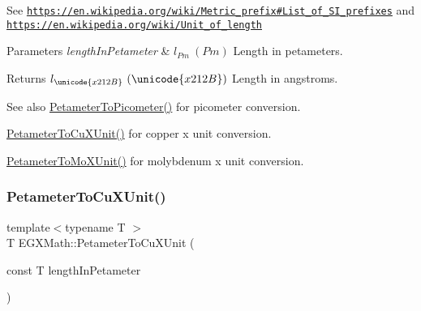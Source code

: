 See \href{https://en.wikipedia.org/wiki/Metric_prefix#List_of_SI_prefixes}{\tt https\+://en.\+wikipedia.\+org/wiki/\+Metric\+\_\+prefix\#\+List\+\_\+of\+\_\+\+S\+I\+\_\+prefixes} and \href{https://en.wikipedia.org/wiki/Unit_of_length}{\tt https\+://en.\+wikipedia.\+org/wiki/\+Unit\+\_\+of\+\_\+length} 
\begin{DoxyParams}{Parameters}
{\em length\+In\+Petameter} & $ l_{Pm}\ (Pm)$ Length in petameters. \\
\hline
\end{DoxyParams}
\begin{DoxyReturn}{Returns}
$ l_{\unicode{x212B}}\ (\unicode{x212B})$ Length in angstroms. 
\end{DoxyReturn}
\begin{DoxySeeAlso}{See also}
\mbox{\hyperlink{group___e_g_x_math-_conversions-_length_conversions-_s_i-_petameter-_s_i_ga092df775702bdd1b027e20a243d0aa75}{Petameter\+To\+Picometer()}} for picometer conversion. 

\mbox{\hyperlink{group___e_g_x_math-_conversions-_length_conversions-_s_i-_petameter-_non-_s_i_gad9b37964189c5963e4c634122fd763fe}{Petameter\+To\+Cu\+X\+Unit()}} for copper x unit conversion. 

\mbox{\hyperlink{group___e_g_x_math-_conversions-_length_conversions-_s_i-_petameter-_non-_s_i_ga29419ba09bb33a7bc9e23f8cde2efea3}{Petameter\+To\+Mo\+X\+Unit()}} for molybdenum x unit conversion. 
\end{DoxySeeAlso}
\mbox{\label{group___e_g_x_math-_conversions-_length_conversions-_s_i-_petameter-_non-_s_i_gad9b37964189c5963e4c634122fd763fe}} 
\subsubsection{\texorpdfstring{Petameter\+To\+Cu\+X\+Unit()}{PetameterToCuXUnit()}}
{\footnotesize\ttfamily template$<$typename T $>$ \\
T E\+G\+X\+Math\+::\+Petameter\+To\+Cu\+X\+Unit (\begin{DoxyParamCaption}\item[{const T}]{length\+In\+Petameter }\end{DoxyParamCaption})}



